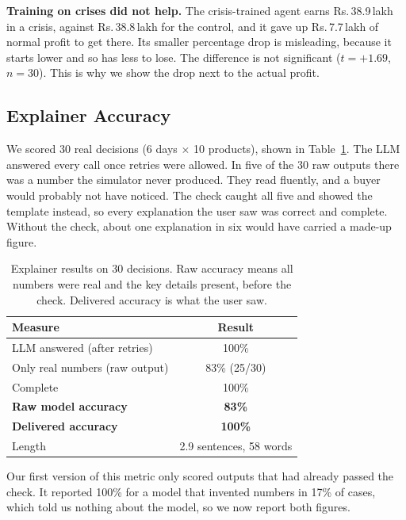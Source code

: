\documentclass[10pt,twocolumn]{article}
\newcommand{\Rs}{\mbox{Rs.}\,}
\newcommand{\lakh}{\,lakh}
\begin{document}
\textbf{Training on crises did not help.} The crisis-trained agent earns
\Rs 38.9\lakh{} in a crisis, against \Rs 38.8\lakh{} for the control, and it
gave up \Rs 7.7\lakh{} of normal profit to get there. Its smaller percentage
drop is misleading, because it starts lower and so has less to lose. The
difference is not significant ($t=+1.69$, $n=30$). This is why we show the drop
next to the actual profit.

\subsection{Explainer Accuracy}

We scored 30 real decisions (6 days $\times$ 10 products), shown in
Table~\ref{tab:explainer}. The LLM answered every call once retries were
allowed. In five of the 30 raw outputs there was a number the simulator never
produced. They read fluently, and a buyer would probably not have noticed. The
check caught all five and showed the template instead, so every explanation the
user saw was correct and complete. Without the check, about one explanation in
six would have carried a made-up figure.

\begin{table}[t]
\centering\small
\begin{tabular}{lc}
\toprule
Measure & Result \\
\midrule
LLM answered (after retries) & 100\% \\
Only real numbers (raw output) & 83\% (25/30) \\
Complete & 100\% \\
\textbf{Raw model accuracy} & \textbf{83\%} \\
\textbf{Delivered accuracy} & \textbf{100\%} \\
Length & 2.9 sentences, 58 words \\
\bottomrule
\end{tabular}
\caption{Explainer results on 30 decisions. Raw accuracy means all numbers were
real and the key details present, before the check. Delivered accuracy is what
the user saw.}
\label{tab:explainer}
\end{table}

Our first version of this metric only scored outputs that had already passed the
check. It reported 100\% for a model that invented numbers in 17\% of cases,
which told us nothing about the model, so we now report both figures.

\end{document}
